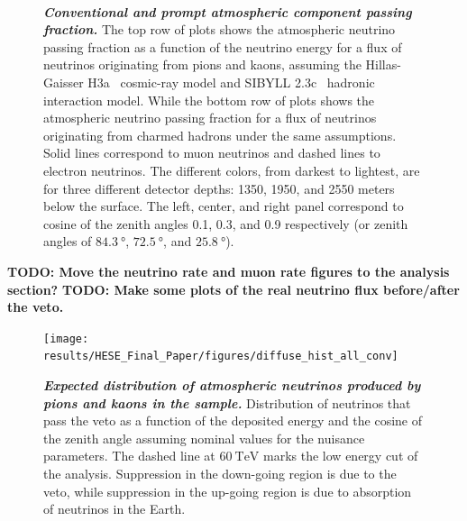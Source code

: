 \begin{figure}
	\centering
	 \\
	\internallinenumbers
	\caption{\textbf{\textit{Conventional and prompt atmospheric component passing fraction.}}
		The top row of plots shows the atmospheric neutrino passing fraction as a function of the neutrino energy for a flux of neutrinos originating from pions and kaons, assuming the Hillas-Gaisser H3a~\cite{Gaisser:2013bla,Gaisser:2011cc,Hillas:2006ms} cosmic-ray model and SIBYLL 2.3c~\cite{Riehn:2017mfm} hadronic interaction model.
		While the bottom row of plots shows the atmospheric neutrino passing fraction for a flux of neutrinos originating from charmed hadrons under the same assumptions.
		Solid lines correspond to muon neutrinos and dashed lines to electron neutrinos.
		The different colors, from darkest to lightest, are for three different detector depths: 1350, 1950, and 2550 meters below the surface.
		The left, center, and right panel correspond to cosine of the zenith angles 0.1, 0.3, and 0.9 respectively (or zenith angles of $\SI{84.3}\degree$, $\SI{72.5}\degree$, and $\SI{25.8}\degree$).}\label{fig:passingfraction}
\end{figure}

\textbf{TODO: Move the neutrino rate and muon rate figures to the analysis section?}
\textbf{TODO: Make some plots of the real neutrino flux before/after the veto.}

\begin{figure}
	\centering
	\texttt{[image: results/HESE\_Final\_Paper/figures/diffuse\_hist\_all\_conv]}
	\internallinenumbers
	\caption{\textbf{\textit{Expected distribution of atmospheric neutrinos produced by pions and kaons in the sample.}} Distribution of neutrinos that pass the veto as a function of the deposited energy and the cosine of the zenith angle assuming nominal values for the nuisance parameters.
		The dashed line at $\SI{60}\TeV$ marks the low energy cut of the analysis.
		Suppression in the down-going region is due to the veto, while suppression in the up-going region is due to absorption of neutrinos in the Earth.}\label{fig:conventional_distribution}
\end{figure}

